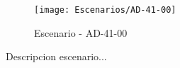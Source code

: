 \begin{figure}[H]
\centering
\texttt{[image: Escenarios/AD-41-00]}
\caption{Escenario - AD-41-00}
\label{fig:AD-41-00}
\end{figure}

Descripcion escenario...
\clearpage
